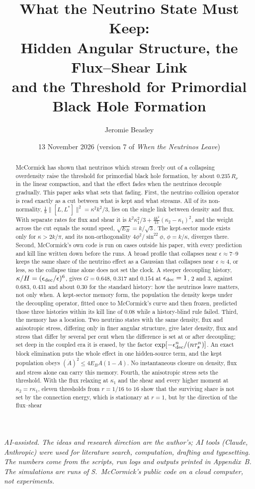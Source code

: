 \documentclass[11pt]{article}
\title{What the Neutrino State Must Keep:\\ Hidden Angular Structure, the Flux--Shear Link\\ and the Threshold for Primordial Black Hole Formation}
\author{Jeromie Beasley}
\date{13 November 2026 \quad (version 7 of \emph{When the Neutrinos Leave})}
\begin{document}
\maketitle

\noindent\emph{AI-assisted. The ideas and research direction are the author's; AI tools (Claude, Anthropic) were used for literature search, computation, drafting and typesetting. The numbers come from the scripts, run logs and outputs printed in Appendix~B. The simulations are runs of S.~McCormick's public code on a cloud computer, not experiments.}

\begin{abstract}
McCormick has shown that neutrinos which stream freely out of a collapsing overdensity raise the threshold for primordial black hole formation, by about $0.235\,R_\nu$ in the linear compaction, and that the effect fades when the neutrinos decouple gradually. This paper asks what sets that fading. First, the neutrino collision operator is read exactly as a cut between what is kept and what streams. All of its non-normality, $\tfrac18\lVert[L,L^\ast]\rVert^2=\kappa^2k^2/3$, lies on the single link between density and flux. With separate rates for flux and shear it is $k^2\kappa_1^2/3+\tfrac{4k^2}{15}(\kappa_2-\kappa_1)^2$, and the weight across the cut equals the sound speed, $\sqrt{E_B}=k/\sqrt3$. The kept-sector mode exists only for $\kappa>2k/\pi$, and its non-orthogonality $4\phi^2/\sin^22\phi$, $\phi=k/\kappa$, diverges there. Second, McCormick's own code is run on cases outside his paper, with every prediction and kill line written down before the runs. A broad profile that collapses near $\epsilon\approx7$--$9$ keeps the same share of the neutrino effect as a Gaussian that collapses near $\epsilon\approx4$, or less, so the collapse time alone does not set the clock. A steeper decoupling history, $\kappa/H=(\epsilon_{\rm dec}/\epsilon)^6$, gives $G=0.648$, $0.317$ and $0.154$ at $\epsilon_{\rm dec}=1$, $2$ and $3$, against $0.683$, $0.431$ and about $0.30$ for the standard history: how the neutrinos leave matters, not only when. A kept-sector memory form, the population the density keeps under the decoupling operator, fitted once to McCormick's curve and then frozen, predicted those three histories within its kill line of $0.08$ while a history-blind rule failed. Third, the memory has a location. Two neutrino states with the same density, flux and anisotropic stress, differing only in finer angular structure, give later density, flux and stress that differ by several per cent when the difference is set at or after decoupling; set deep in the coupled era it is erased, by the factor $\exp[-\epsilon_{\rm dec}^n/(n\tau_s^n)]$. An exact block elimination puts the whole effect in one hidden-source term, and the kept population obeys $(\dot A)^2\le4E_BA(1-A)$. No instantaneous closure on density, flux and stress alone can carry this memory. Fourth, the anisotropic stress sets the threshold. With the flux relaxing at $\kappa_1$ and the shear and every higher moment at $\kappa_2=r\kappa_1$, eleven thresholds from $r=1/16$ to $16$ show that the surviving share is not set by the connection energy, which is stationary at $r=1$, but by the direction of the flux--shear 
\end{abstract}
\end{document}
